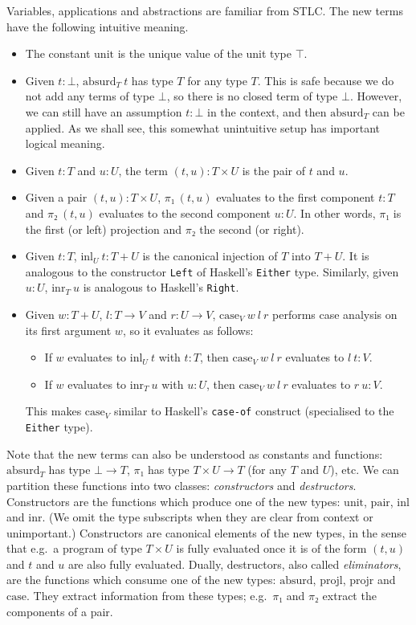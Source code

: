 \documentclass{article}
\theoremstyle{definition}
\newcommand{\unit}{\mathrm{unit}}
\newcommand{\absurd}{\mathrm{absurd}}
\newcommand{\pair}{\mathrm{pair}}
\newcommand{\projl}{\ensuremath{\mathrm{projl}}}
\newcommand{\projr}{\ensuremath{\mathrm{projr}}}
\newcommand{\inl}{\ensuremath{\mathrm{inl}}}
\newcommand{\inr}{\ensuremath{\mathrm{inr}}}
\newcommand{\case}{\mathrm{case}}
\begin{document}
Variables, applications and abstractions are familiar from STLC.
The new terms have the following intuitive meaning.

\begin{itemize}
  \item The constant $\unit$ is the unique value of the unit type $⊤$.
  \item Given $t : ⊥$, $\absurd_{T}~t$ has type $T$ for any type $T$.
        This is safe because we do not add any terms of type $⊥$, so there is no closed term of type $⊥$.
        However, we can still have an assumption $t :  ⊥$ in the context, and then $\absurd_{T}$ can be applied.
        As we shall see, this somewhat unintuitive setup has important logical meaning.
  \item Given $t : T$ and $u : U$, the term $(t, u) : T × U$ is the pair of $t$ and $u$.
  \item Given a pair $(t, u) : T × U$, $π₁~(t, u)$ evaluates to the first component $t : T$ and $π₂~(t, u)$ evaluates to the second component $u : U$.
        In other words, $π₁$ is the first (or left) projection and $π₂$ the second (or right).
  \item Given $t : T$, $\inl_{U}~t : T + U$ is the canonical injection of $T$ into $T + U$.
        It is analogous to the constructor \texttt{Left} of Haskell's \texttt{Either} type.
        Similarly, given $u : U$, $\inr_{T}~u$ is analogous to Haskell's \texttt{Right}.
  \item Given $w : T + U$, $l : T → V$ and $r : U → V$, $\case_{V}~w~l~r$ performs case analysis on its first argument $w$, so it evaluates as follows:
        \begin{itemize}
          \item If $w$ evaluates to $\inl_{U}~t$ with $t : T$, then $\case_{V}~w~l~r$ evaluates to $l~t : V$.
          \item If $w$ evaluates to $\inr_{T}~u$ with $u : U$, then $\case_{V}~w~l~r$ evaluates to $r~u : V$.
        \end{itemize}
        This makes $\case_{V}$ similar to Haskell's \texttt{case-of} construct (specialised to the \texttt{Either} type).
\end{itemize}

Note that the new terms can also be understood as constants and functions: $\absurd_{T}$ has type $⊥ → T$, $π₁$ has type $T × U → T$ (for any $T$ and $U$), etc.
We can partition these functions into two classes: \emph{constructors} and \emph{destructors}.
Constructors are the functions which produce one of the new types: $\unit$, $\pair$, $\inl$ and $\inr$.
(We omit the type subscripts when they are clear from context or unimportant.)
Constructors are canonical elements of the new types, in the sense that e.g.\ a program of type $T × U$ is fully evaluated once it is of the form $(t,u)$ and $t$ and $u$ are also fully evaluated.
Dually, destructors, also called \emph{eliminators}, are the functions which consume one of the new types: $\absurd$, $\projl$, $\projr$ and $\case$.
They extract information from these types; e.g.\ $π₁$ and $π₂$ extract the components of a pair.
\end{document}
